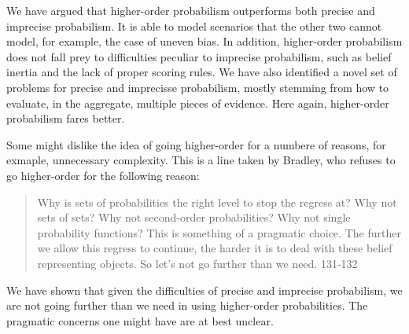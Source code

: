 \documentclass[
  letterpaper,
  DIV=11,
  numbers=noendperiod]{scrartcl}
\begin{document}
We have argued that higher-order probabilism outperforms both precise
and imprecise probabilism. It is able to model scenarios that the other
two cannot model, for example, the case of uneven bias. In addition,
higher-order probabilism does not fall prey to difficulties peculiar to
imprecise probabilism, such as belief inertia and the lack of proper
scoring rules. We have also identified a novel set of problems for
precise and imprecisse probabilism, mostly stemming from how to
evaluate, in the aggregate, multiple pieces of evidence. Here again,
higher-order probabilism fares better.

Some might dislike the idea of going higher-order for a numbere of
reasons, for exmaple, unnecessary complexity. This is a line taken by
Bradley, who refuses to go higher-order for the following reason:

\begin{quote}
Why is sets of probabilities the right level to stop the regress at? Why not sets of sets? Why not second-order probabilities? Why not single probability functions? This is something of a pragmatic choice. The further we allow this regress to continue, the harder it is to deal with these belief representing objects. So let's not go further than we need. 131-132\end{quote}

\noindent We have shown that given the difficulties of precise and
imprecise probabilism, we are not going further than we need in using
higher-order probabilities. The pragmatic concerns one might have are at
best unclear.
\end{document}
